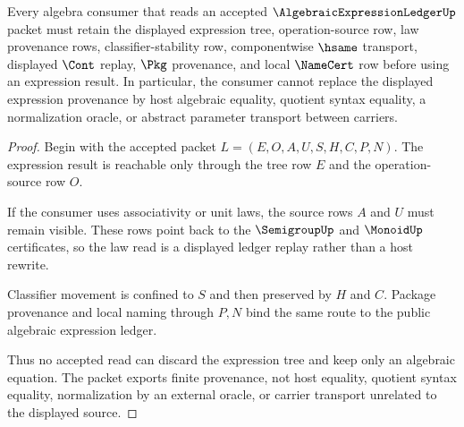 \begin{theorem}
\label{thm:algebraic-expression-ledger-nonescape}
Every algebra consumer that reads an accepted $\AlgebraicExpressionLedgerUp$ packet must retain the displayed expression tree, operation-source row, law provenance rows, classifier-stability row, componentwise $\hsame$ transport, displayed $\Cont$ replay, $\Pkg$ provenance, and local $\NameCert$ row before using an expression result. In particular, the consumer cannot replace the displayed expression provenance by host algebraic equality, quotient syntax equality, a normalization oracle, or abstract parameter transport between carriers.
\end{theorem}
\begin{proof}
Begin with the accepted packet $L=(E,O,A,U,S,H,C,P,N)$. The expression result is reachable only through the tree row $E$ and the operation-source row $O$.

If the consumer uses associativity or unit laws, the source rows $A$ and $U$ must remain visible. These rows point back to the $\SemigroupUp$ and $\MonoidUp$ certificates, so the law read is a displayed ledger replay rather than a host rewrite.

Classifier movement is confined to $S$ and then preserved by $H$ and $C$. Package provenance and local naming through $P,N$ bind the same route to the public algebraic expression ledger.

Thus no accepted read can discard the expression tree and keep only an algebraic equation. The packet exports finite provenance, not host equality, quotient syntax equality, normalization by an external oracle, or carrier transport unrelated to the displayed source.
\end{proof}



